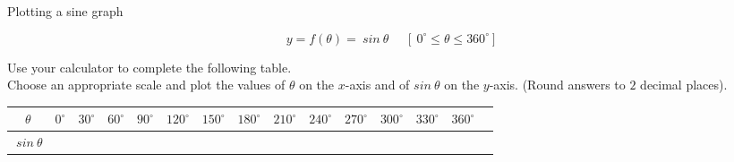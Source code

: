 \begin{wex}
{Plotting a sine graph}
{
\begin{equation*}
  y = f(\theta) = ~sin~\theta~~~~~~[~0^{\circ} \leq \theta \leq 360^{\circ}]
\end{equation*}


Use your calculator to complete the following table. \\
Choose an appropriate scale and plot the values of $\theta $ on the $x$-axis and of $sin~\theta $ on the $y$-axis. (Round answers to $2$ decimal places). 


\begin{table}[H]


\begin{tabular}{|c|m{0.3cm}|m{0.4cm}|m{0.4cm}|m{0.4cm}|m{0.5cm}|m{0.5cm}|m{0.5cm}|m{0.5cm}|m{0.5cm}|m{0.5cm}|m{0.5cm}|m{0.5cm}|m{0.5cm}|} \hline

\footnotesize$\theta $&
\footnotesize$0^{\circ }$&
\footnotesize$30^{\circ }$&
\footnotesize$60^{\circ }$&
\footnotesize$90^{\circ }$&
\footnotesize$120^{\circ }$&
\footnotesize$150^{\circ }$&
\footnotesize$180^{\circ }$&
\footnotesize$210^{\circ }$&
\footnotesize$240^{\circ }$&
\footnotesize$270^{\circ }$&
\footnotesize$300^{\circ }$&
\footnotesize$330^{\circ }$&
\footnotesize$360^{\circ }$
\\ \hline

\footnotesize$~sin~\theta$&
&
&
&
&
&
&
&
&
&
&
&
&
&

 \hline
\end{tabular}

\end{table}
}
{
\begin{table}[H]

\begin{center}


\end{center}
\end{table}}
\end{wex}
